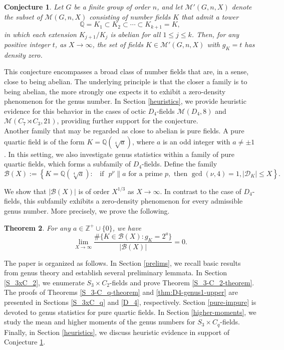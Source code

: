 \documentclass[11pt,reqno]{amsart}
\newcommand{\Q}{\mathbb{Q}}
\newcommand{\Z}{\mathbb{Z}}
\newcommand{\cB}{\mathcal{B}}
\newcommand{\cD}{\mathcal{D}}
\newcommand{\cM}{\mathcal{M}}
\newtheorem{theorem}{Theorem}[section]
\newtheorem{conjecture}[theorem]{Conjecture}
\theoremstyle{definition}
\theoremstyle{remark}
\begin{document}
\begin{conjecture}\label{conj-1}
Let $G$ be a finite group of order $n$, and let $\cM'(G,n,X)$ denote the subset of $\cM(G,n, X)$ consisting of number fields $K$ that admit a tower
\begin{equation*}
\Q=K_1\subset K_2\subset\cdots\subset K_{k+1}=K,
\end{equation*}
in which each extension $K_{j+1}/K_j$ is abelian for all $1\leq j \leq k$. Then, for any positive integer $t$, as $X \to \infty$, the set of fields $K \in \cM'(G,n,X)$ with $g_K=t$ has density zero.
\end{conjecture}


This conjecture encompasses a broad class of number fields that are, in a sense, close to being abelian. The underlying principle is that the closer a family is to being abelian, the more strongly one expects it to exhibit a zero-density phenomenon for the genus number. In Section \ref{heuristics}, we provide heuristic evidence for this behavior in the cases of octic $D_4$-fields $\cM(D_4, 8)$ and $\cM(C_7\rtimes C_3, 21)$, providing further support for the conjecture.\\ 

Another family that may be regarded as close to abelian is pure fields. A pure quartic field is of the form $K = \mathbb{Q}(\sqrt[4]{a})$, where $a$ is an odd integer with $a \neq \pm 1$. In this setting, we also investigate genus statistics within a family of pure quartic fields, which forms a subfamily of $D_4$-fields. Define the family
\begin{equation*}
    \cB(X):= \left\{
K = \mathbb{Q}(\sqrt[4]{a})  : \; \; \text{ if }\,\,  p^{\nu} \parallel a \text{ for a prime } p, \text{ then } 
\gcd(\nu,4) = 1, |\cD_K|\leq X
\right\}.
\end{equation*}

We show that $|\cB(X)|$ is of order $X^{1/3}$ as $X \to \infty$. In contrast to the case of $D_4$-fields, this subfamily exhibits a zero-density phenomenon for every admissible genus number. More precisely, we prove the following.
\begin{theorem}\label{pure-quartic}
For any $a\in\Z^+\cup\{0\}$, we have
    \begin{equation*}
\lim_{X\to\infty} \frac{\#\{K\in \cB(X) : g_K = 2^a\}}{|\cB(X)|} = 0.
\end{equation*}
\end{theorem}

\medskip

The paper is organized as follows. In Section \ref{prelims}, we recall basic results from genus theory and establish several preliminary lemmata. In Section \ref{S_3xC_2}, we enumerate $S_3\times C_2$-fields and prove Theorem \ref{S_3-C_2-theorem}. The proofs of Theorems \ref{S_3-C_q-theorem} and \ref{thm:D4-genus1-upper} are presented in Sections \ref{S_3xC_q} and \ref{D_4}, respectively. Section \ref{pure-impure} is devoted to genus statistics for pure quartic fields. In Section \ref{higher-moments}, we study the mean and higher moments of the genus numbers for $S_3\times C_q$-fields. Finally, in Section \ref{heuristics}, we discuss heuristic evidence in support of Conjecture \ref{conj-1}.
\end{document}
